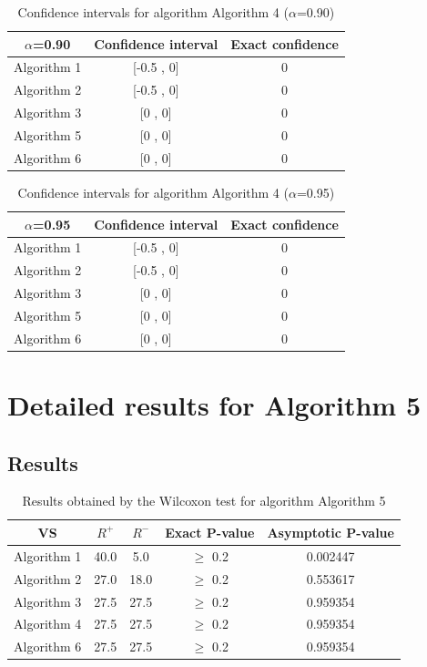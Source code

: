 \documentclass[a4paper,10pt]{article}
\begin{document}
\begin{table}[!htp]
\centering\small
\begin{tabular}{
|c|c|c|}
\hline
 $\alpha$=0.90 & Confidence interval & Exact confidence \\ \hline 
Algorithm 1 & [-0.5 , 0] & 0\\ \hline 
Algorithm 2 & [-0.5 , 0] & 0\\ \hline 
Algorithm 3 & [0 , 0] & 0\\ \hline 
Algorithm 5 & [0 , 0] & 0\\ \hline 
Algorithm 6 & [0 , 0] & 0\\ \hline 

\end{tabular}
\caption{Confidence intervals for algorithm Algorithm 4 ($\alpha$=0.90)}
\end{table}
\begin{table}[!htp]
\centering\small
\begin{tabular}{
|c|c|c|}
\hline
 $\alpha$=0.95 & Confidence interval & Exact confidence \\ \hline 
Algorithm 1 & [-0.5 , 0] & 0\\ \hline 
Algorithm 2 & [-0.5 , 0] & 0\\ \hline 
Algorithm 3 & [0 , 0] & 0\\ \hline 
Algorithm 5 & [0 , 0] & 0\\ \hline 
Algorithm 6 & [0 , 0] & 0\\ \hline 

\end{tabular}
\caption{Confidence intervals for algorithm Algorithm 4 ($\alpha$=0.95)}
\end{table}

 \clearpage 


\section{Detailed results for Algorithm 5}


\subsection{Results}

\begin{table}[!htp]
\centering\small
\begin{tabular}{
|c|c|c|c|c|}
\hline
 VS & $R^{+}$ & $R^{-}$ & Exact P-value & Asymptotic P-value \\ \hline 
Algorithm 1 & 40.0 & 5.0 & $\geq$ 0.2 & 0.002447\\ \hline 
Algorithm 2 & 27.0 & 18.0 & $\geq$ 0.2 & 0.553617\\ \hline 
Algorithm 3 & 27.5 & 27.5 & $\geq$ 0.2 & 0.959354\\ \hline 
Algorithm 4 & 27.5 & 27.5 & $\geq$ 0.2 & 0.959354\\ \hline 
Algorithm 6 & 27.5 & 27.5 & $\geq$ 0.2 & 0.959354\\ \hline 

\end{tabular}
\caption{Results obtained by the Wilcoxon test for algorithm Algorithm 5}
\end{table}
\end{document}
